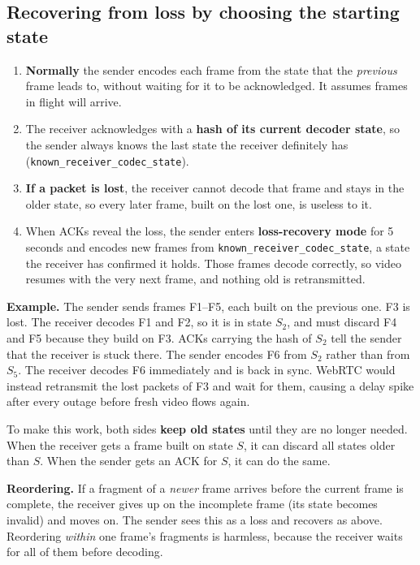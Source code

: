\subsection{Recovering from loss by choosing the starting state}
\begin{enumerate}
  \item \textbf{Normally} the sender encodes each frame from the state that the \emph{previous} frame leads to, without waiting for it to be
        acknowledged. It assumes frames in flight will arrive.
  \item The receiver acknowledges with a \textbf{hash of its current decoder state}, so the sender always knows the last state the receiver
        definitely has (\texttt{known\_receiver\_codec\_state}).
  \item \textbf{If a packet is lost}, the receiver cannot decode that frame and stays in the older state, so every later frame, built on the lost one, is
        useless to it.
  \item When ACKs reveal the loss, the sender enters \textbf{loss-recovery mode} for 5 seconds and encodes new frames from \texttt{known\_receiver\_codec\_state},
        a state the receiver has confirmed it holds. Those frames decode correctly, so video resumes with the very next frame, and nothing old is
        retransmitted.
\end{enumerate}

\textbf{Example.} The sender sends frames F1--F5, each built on the previous one. F3 is lost. The receiver decodes F1 and F2, so it is in state $S_2$,
and must discard F4 and F5 because they build on F3. ACKs carrying the hash of $S_2$ tell the sender that the receiver is stuck there. The sender encodes F6
from $S_2$ rather than from $S_5$. The receiver decodes F6 immediately and is back in sync. WebRTC would instead retransmit the lost packets of F3 and
wait for them, causing a delay spike after every outage before fresh video flows again.

To make this work, both sides \textbf{keep old states} until they are no longer needed. When the receiver gets a frame built on state $S$, it can discard all
states older than $S$. When the sender gets an ACK for $S$, it can do the same.

\textbf{Reordering.} If a fragment of a \emph{newer} frame arrives before the current frame is complete, the receiver gives up on the incomplete frame
(its state becomes invalid) and moves on. The sender sees this as a loss and recovers as above. Reordering \emph{within} one frame's fragments is
harmless, because the receiver waits for all of them before decoding.

